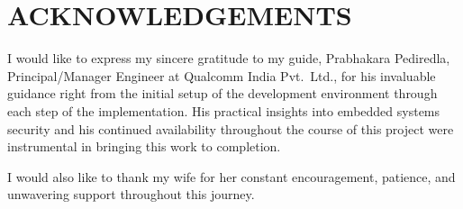 \chapter*{ACKNOWLEDGEMENTS}

I would like to express my sincere gratitude to my guide, Prabhakara Pediredla, Principal/Manager Engineer at Qualcomm India Pvt.\ Ltd., for his invaluable guidance right from the initial setup of the development environment through each step of the implementation. His practical insights into embedded systems security and his continued availability throughout the course of this project were instrumental in bringing this work to completion.

I would also like to thank my wife for her constant encouragement, patience, and unwavering support throughout this journey.
